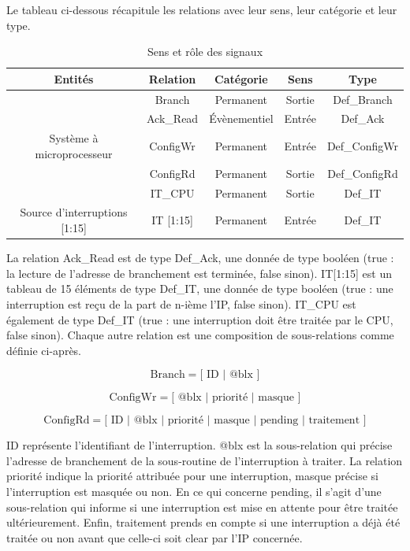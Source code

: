 Le tableau ci-dessous récapitule les relations avec leur sens, leur catégorie et leur type.

\begin{table}[H]
	\centering
	\begin{tabular}{|c|c|c|c|c|}
		\hline
		Entités & Relation & Catégorie & Sens & Type\\
		\hline
		& Branch & Permanent & Sortie & Def\_Branch \\
		& Ack\_Read & Évènementiel & Entrée & Def\_Ack \\
		Système à microprocesseur & ConfigWr & Permanent & Entrée & Def\_ConfigWr \\
		& ConfigRd & Permanent & Sortie & Def\_ConfigRd \\
		& IT\_CPU & Permanent & Sortie & Def\_IT\\
		\hline
		Source d'interruptions [1:15] & IT [1:15] & Permanent & Entrée & Def\_IT\\
		\hline
	\end{tabular}
	\caption{Sens et rôle des signaux}
	\label{tab:entrees_sorties_composant}
\end{table}

La relation Ack\_Read est de type Def\_Ack, une donnée de type booléen (true : la lecture de l'adresse de branchement est terminée, false sinon).
IT[1:15] est un tableau de 15 éléments de type Def\_IT, une donnée de type booléen (true : une interruption est reçu de la part de n-ième l'IP, false sinon).
IT\_CPU est également de type Def\_IT (true : une interruption doit être traitée par le CPU, false sinon).
Chaque autre relation est une composition de sous-relations comme définie ci-après.

\begin{equation*}
\mbox{Branch} = \big[ \mbox{ ID } | \mbox{ @blx } \big]
\end{equation*}

\begin{equation*}
\mbox{ConfigWr} = \big[ \mbox{ @blx } | \mbox{ priorité } | \mbox{ masque } \big]
\end{equation*}

\begin{equation*}
\mbox{ConfigRd} = \big[ \mbox{ ID } | \mbox{ @blx } | \mbox{ priorité } | \mbox{ masque } | \mbox{ pending } | \mbox{ traitement } \big]
\end{equation*}

ID représente l'identifiant de l'interruption.
@blx est la sous-relation qui précise l'adresse de branchement de la sous-routine de l'interruption à traiter.
La relation priorité indique la priorité attribuée pour une interruption, masque précise si l'interruption est masquée ou non.
En ce qui concerne pending, il s'agit d'une sous-relation qui informe si une interruption est mise en attente pour être traitée ultérieurement.
Enfin, traitement prends en compte si une interruption a déjà été traitée ou non avant que celle-ci soit clear par l'IP concernée.

